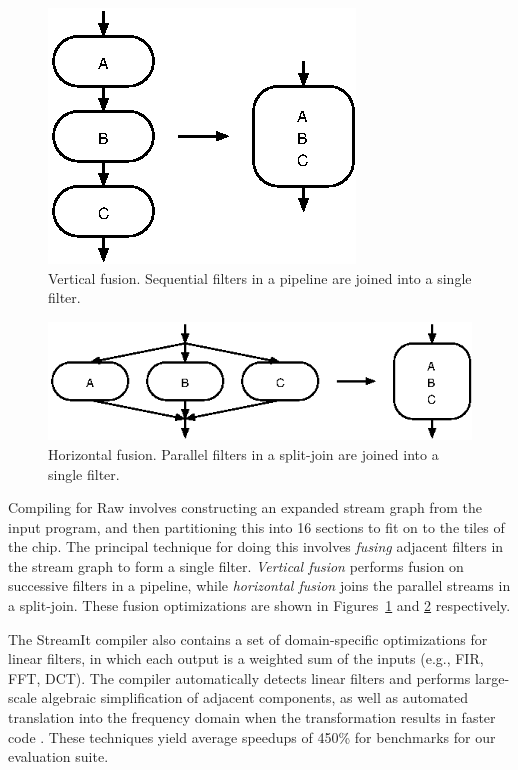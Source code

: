 \begin{figure}
  \centering
  \includegraphics{fusion-vert}
  \caption{Vertical fusion.  Sequential filters in a pipeline are
    joined into a single filter.}
  \label{fig:vert-fusion}
\end{figure}
\begin{figure}
  \centering
  \includegraphics{fusion-horiz}
  \caption{Horizontal fusion.  Parallel filters in a split-join are
    joined into a single filter.}
  \label{fig:horiz-fusion}
\end{figure}

Compiling for Raw involves constructing an expanded stream graph from
the input program, and then partitioning this into 16 sections to fit
on to the tiles of the chip\cite{gordon02}.  The principal technique
for doing this involves \emph{fusing} adjacent filters in the stream
graph to form a single filter.  \emph{Vertical fusion} performs fusion
on successive filters in a pipeline, while \emph{horizontal fusion}
joins the parallel streams in a split-join.  These fusion
optimizations are shown in Figures~\ref{fig:vert-fusion} and
\ref{fig:horiz-fusion} respectively.

The  StreamIt   compiler  also  contains  a   set  of  domain-specific
optimizations for linear  filters, in which each output  is a weighted
sum of  the inputs (e.g.,  FIR, FFT, DCT). The  compiler automatically
detects   linear   filters    and   performs   large-scale   algebraic
simplification   of  adjacent   components,  as   well   as  automated
translation into the frequency  domain when the transformation results
in  faster  code \cite{lamb03}.  These  techniques yield  average
speedups of 450\% for benchmarks for our evaluation suite.

